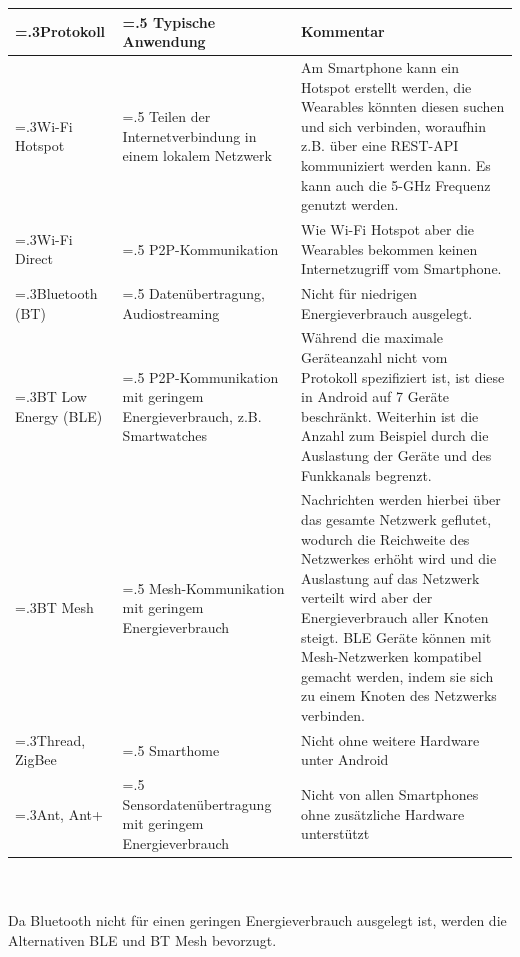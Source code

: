\begin{minipage}{\linewidth}
        \renewcommand\footnoterule{}
        \renewcommand{\thefootnote}{\alph{footnote}}
	\label{tab:p2p_protocols}
	\begin{tabularx}{\linewidth}{>{\hsize=.3\hsize}X|>{\hsize=.5\hsize}X|X}
		Protokoll & Typische Anwendung & Kommentar\\
		\hline
		Wi-Fi Hotspot & Teilen der Internetverbindung in einem lokalem Netzwerk & Am Smartphone kann ein Hotspot erstellt werden, die Wearables könnten diesen suchen und sich verbinden, woraufhin z.B. über eine REST-API kommuniziert werden kann. Es kann auch die 5-GHz Frequenz genutzt werden.\\
		Wi-Fi Direct & P2P-Kommunikation & Wie Wi-Fi Hotspot aber die Wearables bekommen keinen Internetzugriff vom Smartphone.\\
		Bluetooth (BT) & Datenübertragung, Audiostreaming & Nicht für niedrigen Energieverbrauch ausgelegt.\\
		BT Low Energy (BLE) & P2P-Kommunikation mit geringem Energieverbrauch, z.B. Smartwatches & Während die maximale Geräteanzahl nicht vom Protokoll spezifiziert ist, ist diese in Android auf 7 Geräte beschränkt\footnotemark[1]. Weiterhin ist die Anzahl zum Beispiel durch die Auslastung der Geräte und des Funkkanals begrenzt.\\
		BT Mesh & Mesh-Kommunikation mit geringem Energieverbrauch & Nachrichten werden hierbei über das gesamte Netzwerk geflutet, wodurch die Reichweite des Netzwerkes erhöht wird und die Auslastung auf das Netzwerk verteilt wird aber der Energieverbrauch aller Knoten steigt. BLE Geräte können mit Mesh-Netzwerken kompatibel gemacht werden, indem sie sich zu einem Knoten des Netzwerks verbinden.\\
		Thread, ZigBee & Smarthome & Nicht ohne weitere Hardware unter Android\\
		Ant, Ant+ & Sen\-sor\-da\-ten\-über\-tra\-gung mit geringem Energieverbrauch & Nicht von allen Smartphones ohne zusätzliche Hardware unterstützt\\
	\end{tabularx}
\end{minipage}\\\\
Da Bluetooth nicht für einen geringen Energieverbrauch ausgelegt ist, werden die Alternativen BLE und BT Mesh bevorzugt.
